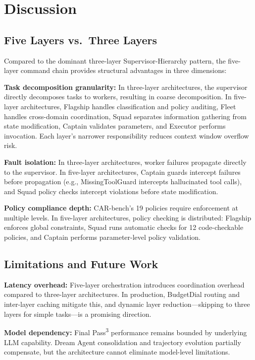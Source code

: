 \documentclass{article}
\begin{document}
\section{Discussion}

\subsection{Five Layers vs.\ Three Layers}

Compared to the dominant three-layer Supervisor-Hierarchy pattern, the five-layer command chain provides structural advantages in three dimensions:

\textbf{Task decomposition granularity:} In three-layer architectures, the supervisor directly decomposes tasks to workers, resulting in coarse decomposition. In five-layer architectures, Flagship handles classification and policy auditing, Fleet handles cross-domain coordination, Squad separates information gathering from state modification, Captain validates parameters, and Executor performs invocation. Each layer's narrower responsibility reduces context window overflow risk.

\textbf{Fault isolation:} In three-layer architectures, worker failures propagate directly to the supervisor. In five-layer architectures, Captain guards intercept failures before propagation (e.g., MissingToolGuard intercepts hallucinated tool calls), and Squad policy checks intercept violations before state modification.

\textbf{Policy compliance depth:} CAR-bench's 19 policies require enforcement at multiple levels. In five-layer architectures, policy checking is distributed: Flagship enforces global constraints, Squad runs automatic checks for 12 code-checkable policies, and Captain performs parameter-level policy validation.

\subsection{Limitations and Future Work}

\textbf{Latency overhead:} Five-layer orchestration introduces coordination overhead compared to three-layer architectures. In production, BudgetDial routing and inter-layer caching mitigate this, and dynamic layer reduction---skipping to three layers for simple tasks---is a promising direction.

\textbf{Model dependency:} Final Pass\textsuperscript{3} performance remains bounded by underlying LLM capability. Dream Agent consolidation and trajectory evolution partially compensate, but the architecture cannot eliminate model-level limitations.
\end{document}
